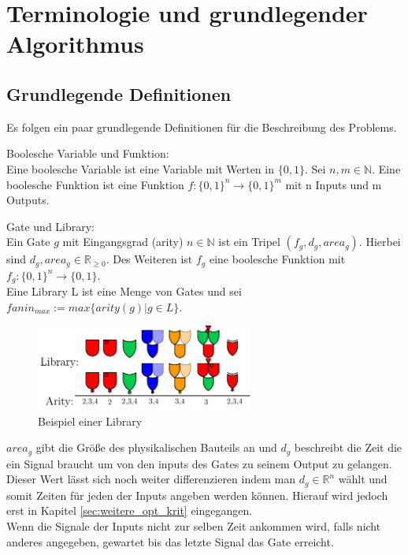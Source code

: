 \documentclass[11pt, a4paper, german]{article}
\begin{document}
\newpage

\section{Terminologie und grundlegender Algorithmus}
\label{sec:terminologie&grundl}
\subsection{Grundlegende Definitionen}
\label{subsec:grundlegende_definitionen}
Es folgen ein paar grundlegende Definitionen für die Beschreibung des Problems.

\begin{definition}{Boolesche Variable und Funktion: } \\
Eine boolesche Variable ist eine Variable mit Werten in $ \{ 0 , 1 \} $.
Sei $ n, m \in \mathbb{N}$. Eine boolesche Funktion ist eine Funktion $ f : \{ 0 , 1 \}^n \rightarrow \{ 0 , 1 \}^m $ mit n Inputs und m Outputs. 
\end{definition}

\begin{definition}{Gate und Library:}\label{def:gate}\\
Ein Gate $g$ mit Eingangsgrad (arity) $ n \in \mathbb{N}$ ist ein Tripel $(f_g, d_g, area_g)$. Hierbei sind $d_g, area_g \in \mathbb{R}_{\geq 0}$. Des Weiteren ist $f_g$ eine boolesche Funktion mit $ f_g : \{0,1\}^n \rightarrow \{0, 1\} $. \\
Eine Library L ist eine Menge von Gates und sei \\ 
$fanin_{max} := max\{ arity(g) | g \in L \}$.
\end{definition}
\begin{figure}[h]
\begin{center}
 \includegraphics[height = 80pt]{./pictures/compiled/new_library.pdf}
 \caption{Beispiel einer Library}
 \label{bild:new_library}
\end{center}
\end{figure}
$area_g$ gibt die Größe des physikalischen Bauteils an und $d_g$ beschreibt die Zeit die ein Signal braucht um von den inputs des Gates zu seinem Output zu gelangen. Dieser Wert lässt sich noch weiter differenzieren indem man $d_g \in \mathbb{R}^n$ wählt und somit Zeiten für jeden der Inputs angeben werden können. Hierauf wird jedoch erst in Kapitel \ref{sec:weitere_opt_krit} eingegangen. \\
Wenn die Signale der Inputs nicht zur selben Zeit ankommen wird, falls nicht anderes angegeben, gewartet bis das letzte Signal das Gate erreicht.
\end{document}

